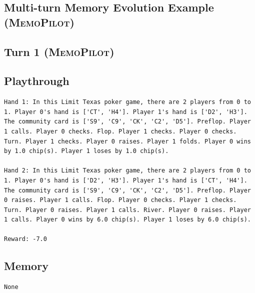 \documentclass{article}
\newcommand{\methodname}{MemoPilot}
\newcommand{\method}{\textsc{\methodname}}
\theoremstyle{plain}
\theoremstyle{definition}
\theoremstyle{remark}
\begin{document}
\subsection{Multi-turn Memory Evolution Example (\method{})}\label{appendix:memory_case_3}
\begin{tcolorbox}[breakable]
\subsection*{Turn 1 (\method{})}
\vspace{-5pt}

\subsection*{Playthrough }
\vspace{-5pt}
\begin{lstlisting}[basicstyle=\scriptsize\ttfamily, breaklines=true]
Hand 1: In this Limit Texas poker game, there are 2 players from 0 to 1. Player 0's hand is ['CT', 'H4']. Player 1's hand is ['D2', 'H3']. The community card is ['S9', 'C9', 'CK', 'C2', 'D5']. Preflop. Player 1 calls. Player 0 checks. Flop. Player 1 checks. Player 0 checks. Turn. Player 1 checks. Player 0 raises. Player 1 folds. Player 0 wins by 1.0 chip(s). Player 1 loses by 1.0 chip(s).

Hand 2: In this Limit Texas poker game, there are 2 players from 0 to 1. Player 0's hand is ['D2', 'H3']. Player 1's hand is ['CT', 'H4']. The community card is ['S9', 'C9', 'CK', 'C2', 'D5']. Preflop. Player 0 raises. Player 1 calls. Flop. Player 0 checks. Player 1 checks. Turn. Player 0 raises. Player 1 calls. River. Player 0 raises. Player 1 calls. Player 0 wins by 6.0 chip(s). Player 1 loses by 6.0 chip(s).

Reward: -7.0

\end{lstlisting}
\vspace{5pt}

\subsection*{Memory }
\vspace{-5pt}
\begin{lstlisting}[basicstyle=\scriptsize\ttfamily, breaklines=true]
None
\end{lstlisting}
\end{tcolorbox}
\end{document}
